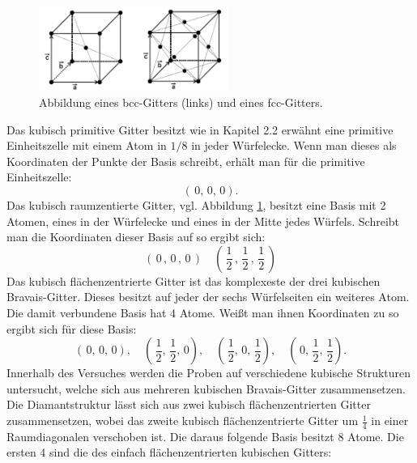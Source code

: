 \begin{figure}
    \centering
    \includegraphics[width=0.55\textwidth]{ressources/kubies.png}
    \caption{Abbildung eines bcc-Gitters (links) und eines fcc-Gitters\cite{skript}.}
    \label{bcc}
\end{figure}

Das kubisch primitive Gitter besitzt wie in Kapitel 2.2 erwähnt eine
primitive Einheitszelle mit einem Atom in $1/8$ in jeder Würfelecke.
Wenn man dieses als Koordinaten der Punkte der Basis
schreibt, erhält man für die primitive Einheitszelle:
$$ (\,0,\,0,\,0).$$
Das kubisch raumzentierte Gitter, vgl. Abbildung \ref{bcc}, besitzt eine Basis mit 2 Atomen,
eines in der Würfelecke und eines in der Mitte jedes Würfels. Schreibt man
die Koordinaten dieser Basis auf so ergibt sich:
$$(\,0\,,\,0\,,\,0\,) \quad (\,\frac{1}{2}\,, \,\frac{1}{2}\, ,\, \frac{1}{2}\,)$$
Das kubisch flächenzentrierte Gitter ist das komplexeste der drei kubischen Bravais-Gitter.
Dieses besitzt auf jeder der sechs Würfelseiten ein weiteres Atom. Die damit
verbundene Basis hat 4 Atome. Weißt man ihnen Koordinaten zu so ergibt sich
für diese Basis:
$$(\,0,\,0,\,0), \quad (\,\frac{1}{2},\, \frac{1}{2} ,\, 0), \quad (\, \frac{1}{2}, \,0 ,\, \frac{1}{2}),
\quad (\,0, \, \frac{1}{2} , \, \frac{1}{2}).$$
Innerhalb des Versuches werden die Proben auf verschiedene kubische Strukturen
untersucht, welche sich aus mehreren kubischen Bravais-Gitter zusammensetzen.
Die Diamantstruktur lässt sich aus zwei kubisch flächenzentrierten Gitter
zusammensetzen, wobei das zweite kubisch flächenzentrierte Gitter um
$\frac{1}{4}$ in einer Raumdiagonalen verschoben ist. Die daraus folgende
Basis besitzt 8 Atome. Die ersten 4 sind die des einfach flächenzentrierten
kubischen Gitters:

